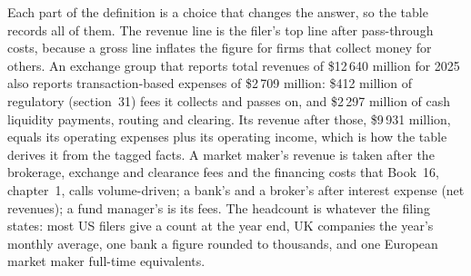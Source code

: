 Each part of the definition is a choice that changes the answer, so the table records all of them. The revenue line is
the filer's top line after pass-through costs, because a gross line inflates the figure for firms that collect money
for others. An exchange group that reports total revenues of \$12\,640 million for 2025 also reports
transaction-based expenses of \$2\,709 million: \$412 million of regulatory (section~31) fees it collects and passes on,
and \$2\,297 million of cash liquidity payments, routing and clearing. Its revenue after those, \$9\,931 million, equals its operating expenses plus its operating income, which is how the table
derives it from the tagged facts. A market maker's revenue is taken after the brokerage, exchange and clearance fees and
the financing costs that Book~16, chapter~1, calls volume-driven; a bank's and a broker's after interest expense (net
revenues); a fund manager's is its fees. The headcount is whatever the filing states: most US filers give a count at
the year end, UK companies the year's monthly average, one bank a figure rounded to thousands, and one European market
maker full-time equivalents.

